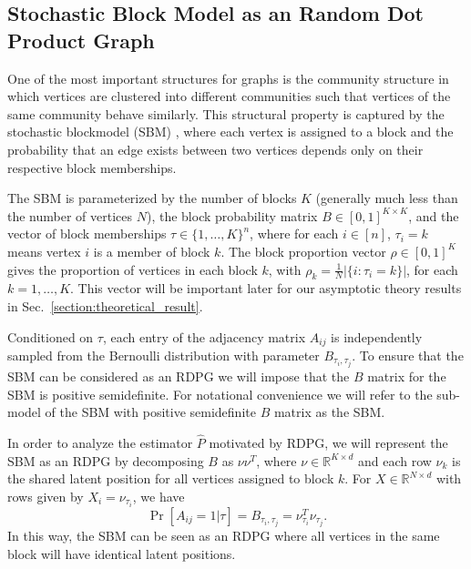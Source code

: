\documentclass[10pt,letterpaper]{article}
\begin{document}
\subsection{Stochastic Block Model as an Random Dot Product Graph}
\label{section:sbm_rdpg}
One of the most important structures for graphs is the community structure in which vertices are clustered into different communities such that vertices of the same community behave similarly. This structural property is captured by the stochastic blockmodel (SBM) \cite{holland1983stochastic}, where each vertex is assigned to a block and the probability that an edge exists between two vertices depends only on their respective block memberships.

The SBM is parameterized by the number of blocks $K$ (generally much less than the number of vertices $N$), the block probability matrix $B \in [0,1]^{K \times K}$, and the vector of block memberships
$\tau\in\{1,\dotsc,K\}^n$, where for each $i \in [n]$, $\tau_i = k$ means vertex $i$ is a member of block $k$.
The block proportion vector $\rho\in[0,1]^K$ gives the proportion of vertices in each block $k$, with $\rho_k=\frac{1}{N} |\{i: \tau_i=k\}|$, for each $k=1,\dotsc,K$.
This vector will be important later for our asymptotic theory results in Sec.~\ref{section:theoretical_result}.

Conditioned on $\tau$, each entry of the adjacency matrix $A_{ij}$ is independently sampled from the Bernoulli distribution with parameter $B_{\tau_i,\tau_j}$.
To ensure that the SBM can be considered as an RDPG we will impose that the $B$ matrix for the SBM is positive semidefinite. 
For notational convenience we will refer to the sub-model of the SBM with positive semidefinite $B$ matrix as the SBM.

In order to analyze the estimator $\hat{P}$ motivated by RDPG, we will represent the SBM as an RDPG by
decomposing $B$ as $\nu \nu^T$, where $\nu \in \mathbb{R}^{K \times d}$ and each row $\nu_k$ is the shared latent position for all vertices assigned to block $k$. 
For $X \in \mathbb{R}^{N \times d}$ with rows given by $X_i = \nu_{\tau_i}$, we have
\[
    \Pr[A_{ij} = 1|\tau] = B_{\tau_i, \tau_j} = \nu_{\tau_i}^T \nu_{\tau_j}.
\]
In this way, the SBM can be seen as an RDPG where all vertices in the same block will have identical latent positions.
\end{document}
